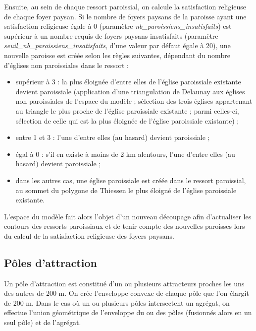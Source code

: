 \documentclass[a4paper,11pt]{article}
\begin{document}
{\begin{sloppypar}
Ensuite, au sein de chaque ressort paroissial, on calcule la satisfaction religieuse de chaque foyer paysan. Si le nombre de foyers paysans de la paroisse ayant une satisfaction religieuse égale à 0 (paramètre \textit{nb\_paroissiens\_insatisfaits}) est supérieur à un nombre requis de foyers paysans insatisfaits (paramètre \textit{seuil\_nb\_paroissiens\_insatisfaits}, d'une valeur par défaut égale à 20), une nouvelle paroisse est créée selon les règles suivantes, dépendant du nombre d'églises non paroissiales dans le ressort :
	\begin{itemize}
\item supérieur à 3 : la plus éloignée d'entre elles de l'église paroissiale existante devient paroissiale (application d'une triangulation de Delaunay aux églises non paroissiales de l'espace du modèle ; sélection des trois églises appartenant au triangle le plus proche de l'église paroissiale existante ; parmi celles-ci, sélection de celle qui est la plus éloignée de l'église paroissiale existante) ;
\item entre 1 et 3 : l'une d'entre elles (au hasard) devient paroissiale ;
\item égal à 0 : s'il en existe à moins de 2 km alentours, l'une d'entre elles (au hasard) devient paroissiale ;
\item dans les autres cas, une église paroissiale est créée dans le ressort paroissial, au sommet du polygone de Thiessen le plus éloigné de l'église paroissiale existante.
	\end{itemize}
	
L'espace du modèle fait alors l'objet d'un nouveau découpage afin d'actualiser les contours des ressorts paroissiaux et de tenir compte des nouvelles paroisses lors du calcul de la satisfaction religieuse des foyers paysans.
\end{sloppypar}


\subsection{Pôles d'attraction}

Un pôle d'attraction est constitué d'un ou plusieurs attracteurs proches les uns des autres de 200 m. On crée l'enveloppe convexe de chaque pôle que l'on élargit de 200 m. Dans le cas où un ou plusieurs pôles intersectent un agrégat, on effectue l'union géométrique de l'enveloppe du ou des pôles (fusionnés alors en un seul pôle) et de l'agrégat.

}
\end{document}
